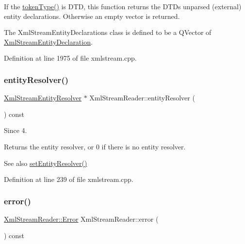 If the \hyperlink{class_xml_stream_reader_a2c26bfb63c27f2992e24f038d65c8c0a}{token\+Type()} is  D\+TD, this function returns the D\+TD\textquotesingle{}s unparsed (external) entity declarations. Otherwise an empty vector is returned.

The Xml\+Stream\+Entity\+Declarations class is defined to be a Q\+Vector of \hyperlink{class_xml_stream_entity_declaration}{Xml\+Stream\+Entity\+Declaration}. 

Definition at line 1975 of file xmlstream.\+cpp.

\mbox{\label{class_xml_stream_reader_aac2531acc527bccec511df4c29ed2ff8}} 
\subsubsection{\texorpdfstring{entity\+Resolver()}{entityResolver()}}
{\footnotesize\ttfamily \hyperlink{class_xml_stream_entity_resolver}{Xml\+Stream\+Entity\+Resolver} $\ast$ Xml\+Stream\+Reader\+::entity\+Resolver (\begin{DoxyParamCaption}{ }\end{DoxyParamCaption}) const}

\begin{DoxySince}{Since}
4.
\end{DoxySince}
Returns the entity resolver, or 0 if there is no entity resolver.

\begin{DoxySeeAlso}{See also}
\hyperlink{class_xml_stream_reader_af77e0f8b78b6cedfaec4a34634670893}{set\+Entity\+Resolver()} 
\end{DoxySeeAlso}


Definition at line 239 of file xmlstream.\+cpp.

\mbox{\label{class_xml_stream_reader_ae9a7e8fe9f15b0f5c4ec5fa080c6249f}} 
\subsubsection{\texorpdfstring{error()}{error()}}
{\footnotesize\ttfamily \hyperlink{class_xml_stream_reader_ae7aa6749ae6e9de9bcb6f084a9884286}{Xml\+Stream\+Reader\+::\+Error} Xml\+Stream\+Reader\+::error (\begin{DoxyParamCaption}{ }\end{DoxyParamCaption}) const}

